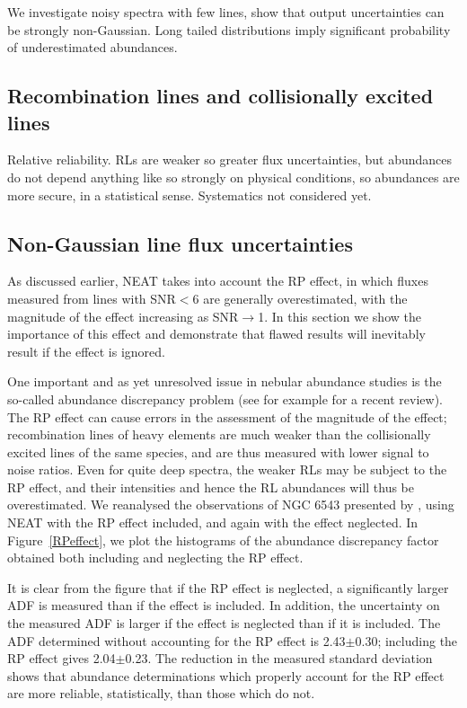\documentclass[useAMS,usenatbib]{mn2e}
\begin{document}
We investigate noisy spectra with few lines, show that output uncertainties can be strongly non-Gaussian.  Long tailed distributions imply significant probability of underestimated abundances.

\subsection{Recombination lines and collisionally excited lines}

Relative reliability.  RLs are weaker so greater flux uncertainties, but abundances do not depend anything like so strongly on physical conditions, so abundances are more secure, in a statistical sense.  Systematics not considered yet.

\subsection{Non-Gaussian line flux uncertainties}

As discussed earlier, NEAT takes into account the RP effect, in which fluxes measured from lines with SNR$<$6 are generally overestimated, with the magnitude of the effect increasing as SNR$\to$1.  In this section we show the importance of this effect and demonstrate that flawed results will inevitably result if the effect is ignored.

One important and as yet unresolved issue in nebular abundance studies is the so-called abundance discrepancy problem (see for example \citet{2006IAUS..234..219L} for a recent review).  The RP effect can cause errors in the assessment of the magnitude of the effect; recombination lines of heavy elements are much weaker than the collisionally excited lines of the same species, and are thus measured with lower signal to noise ratios.  Even for quite deep spectra, the weaker RLs may be subject to the RP effect, and their intensities and hence the RL abundances will thus be overestimated.  We reanalysed the observations of NGC 6543 presented by \citep{2004MNRAS.351.1026W}, using NEAT with the RP effect included, and again with the effect neglected.  In Figure~\ref{RPeffect}, we plot the histograms of the abundance discrepancy factor obtained both including and neglecting the RP effect.

It is clear from the figure that if the RP effect is neglected, a significantly larger ADF is measured than if the effect is included.  In addition, the uncertainty on the measured ADF is larger if the effect is neglected than if it is included.  The ADF determined without accounting for the RP effect is 2.43$\pm$0.30; including the RP effect gives 2.04$\pm$0.23.  The reduction in the measured standard deviation shows that abundance determinations which properly account for the RP effect are more reliable, statistically, than those which do not.
\end{document}
